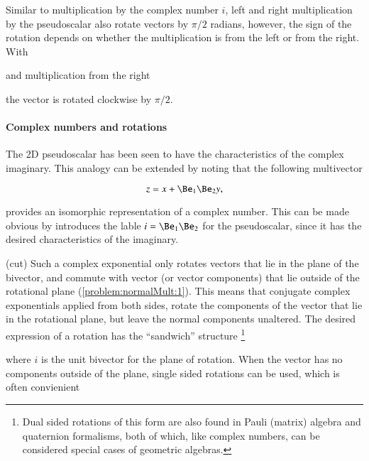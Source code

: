 Similar to multiplication by the complex number \( i \),
left and right multiplication by the pseudoscalar also rotate vectors by \( \pi/2 \) radians, however, the sign of the rotation depends on whether the multiplication is from the left or from the right.
With

and multiplication from the right

the vector is rotated clockwise by \( \pi/2 \).
%
\paragraph{Complex numbers and rotations}

The 2D pseudoscalar has been seen to have the characteristics of the complex imaginary.
This analogy can be extended by noting that the following multivector

\begin{dmath}\label{eqn:SimpleProducts2:320}
z = x + \Be_1 \Be_2 y,
\end{dmath}

provides an isomorphic representation of a complex number.
This can be made obvious by introduces the lable \( i = \Be_1 \Be_2 \) for the pseudoscalar, since it has the desired characteristics of the imaginary.

(cut)
Such a complex exponential only rotates vectors that lie in the plane of the bivector, and commute with vector (or vector components) that lie outside of the rotational plane (\cref{problem:normalMult:1}).
This means that conjugate complex exponentials applied from both sides,
rotate the components of the vector that lie in the rotational plane, but leave the normal components unaltered.
The desired expression of a  rotation
has the ``sandwich'' structure
\footnote{Dual sided rotations of this form are also found in Pauli (matrix) algebra and quaternion formalisms, both of which, like complex numbers, can be considered special cases of geometric algebras.}


where \( i \) is the unit bivector for the plane of rotation.
When the vector has no components outside of the plane, single sided rotations can be used, which is often convienient

